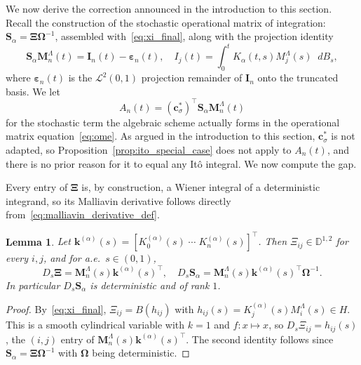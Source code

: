 \documentclass[11pt, a4paper]{article}
\theoremstyle{theoremstyle}
\newtheorem{lemma}[theorem]{Lemma}
\theoremstyle{definitionstyle}
\newcommand{\dd}{\mathop{}\!d}
\begin{document}
We now derive the correction announced in the introduction to this section. Recall the construction of the stochastic operational matrix of integration: $\mathbf S_\alpha = \boldsymbol \Xi \boldsymbol \Omega^{-1}$, assembled with~\eqref{eq:xi_final}, along with the projection identity
\begin{equation}\label{eq:projection_identity}
    \mathbf S_\alpha\mathbf M_n^\Lambda(t) = \mathbf I_n(t) - \boldsymbol \varepsilon_n(t), \quad I_j(t) = \int_0^t K_\alpha(t,s)M_j^\Lambda(s)\dd{B_s},
\end{equation}
where $\boldsymbol\varepsilon_n(t)$ is the $\mathcal L^2(0,1)$ projection remainder of $\mathbf I_n$ onto the truncated basis. We let
\begin{equation}\label{eq:An}
    A_n(t) = (\mathbf c_\sigma^*)^\top\mathbf S_\alpha\mathbf M_n^\Lambda(t)
\end{equation}
for the stochastic term the algebraic scheme actually forms in the operational matrix equation~\eqref{eq:ome}. As argued in the introduction to this section, $\mathbf c_\sigma^*$ is not adapted, so Proposition~\ref{prop:ito_special_case} does not apply to $A_n(t)$, and there is no prior reason for it to equal any Itô integral. We now compute the gap.

Every entry of $\boldsymbol \Xi$ is, by construction, a Wiener integral of a deterministic integrand, so its Malliavin derivative follows directly from~\eqref{eq:malliavin_derivative_def}.

\begin{lemma}\label{lem:DS}
    Let $\mathbf k^{(\alpha)}(s) = [ K_0^{(\alpha)}(s) \; \cdots \; K_n^{(\alpha)}(s) ]^\top$. Then $\Xi_{ij} \in \mathbb D^{1,2}$ for every $i,j$, and for a.e.\ $s\in(0,1)$,
    \begin{equation}\label{eq:DXi}
        D_s \boldsymbol \Xi = \mathbf M_n^\Lambda(s) \mathbf k^{(\alpha)}(s)^\top, \quad D_s\mathbf S_\alpha = \mathbf M_n^\Lambda(s)\mathbf k^{(\alpha)}(s)^\top \boldsymbol \Omega^{-1}.
    \end{equation}
    In particular $D_s\mathbf S_\alpha$ is deterministic and of rank $1$.
\end{lemma}
\begin{proof}
    By~\eqref{eq:xi_final}, $\Xi_{ij}=B(h_{ij})$ with $h_{ij}(s)=K_j^{(\alpha)}(s)M_i^\Lambda(s)\in H$. This is a smooth cylindrical variable with $k=1$ and $f : x \mapsto x$, so $D_s\Xi_{ij}=h_{ij}(s)$, the $(i,j)$ entry of $\mathbf M_n^\Lambda(s)\mathbf k^{(\alpha)}(s)^\top$. The second identity follows since $\mathbf S_\alpha=\boldsymbol\Xi\boldsymbol\Omega^{-1}$ with $\boldsymbol\Omega$ being deterministic.
\end{proof}
\end{document}
